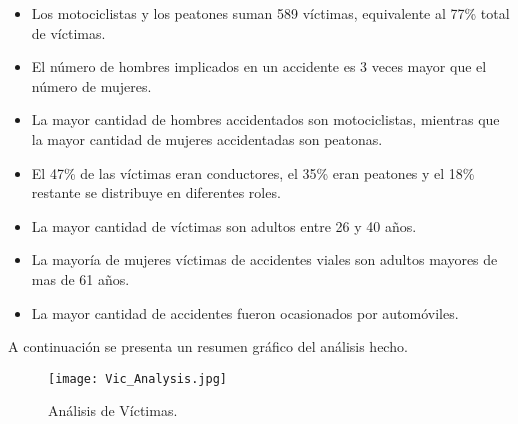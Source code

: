 \documentclass[12pt]{article}
\begin{document}
\begin{itemize}
    \item Los motociclistas y los peatones suman 589 víctimas, equivalente al 77\% total de víctimas.

    \item El número de hombres implicados en un accidente es 3 veces mayor que el número de mujeres. 

    \item La mayor cantidad de hombres accidentados son motociclistas, mientras que la mayor cantidad de mujeres accidentadas son peatonas.
    
    \item El 47\% de las víctimas eran conductores, el 35\% eran peatones y el 18\% restante se distribuye en diferentes roles.

    \item La mayor cantidad de víctimas son adultos entre 26 y 40 años.
    
    \item La mayoría de mujeres víctimas de accidentes viales son adultos mayores de mas de 61 años.

    \item La mayor cantidad de accidentes fueron ocasionados por automóviles.
\end{itemize}

A continuación se presenta un resumen gráfico del análisis hecho. 

\begin{figure}[H]
  \centering
  \texttt{[image: Vic\_Analysis.jpg]}
  \caption{Análisis de Víctimas.}
  \label{fig:vic-analysis}
\end{figure}
\end{document}
